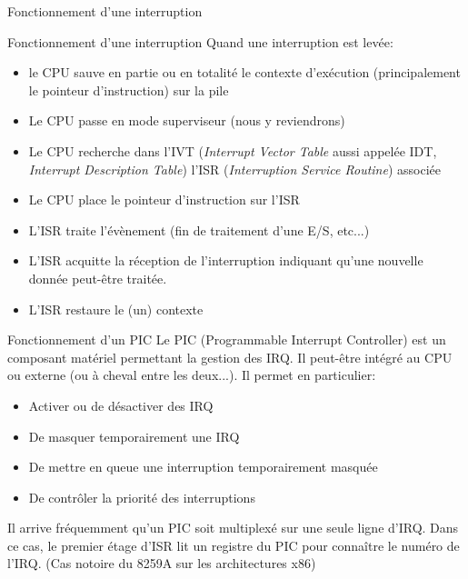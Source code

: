\begin{frame}{Fonctionnement d'une interruption}
  \begin{center}
  \end{center}
\end{frame}

\begin{frame}{Fonctionnement d'une interruption}
  Quand une  interruption est levée:
  \begin{itemize}
  \item le CPU sauve en  partie ou en totalité le contexte d'exécution
    (principalement le pointeur d'instruction) sur la pile
  \item Le CPU passe en mode superviseur (nous y reviendrons)
  \item  Le CPU  recherche dans  l'IVT (\emph{Interrupt  Vector Table}
    aussi  appelée  IDT,  \emph{Interrupt  Description  Table})  l'ISR
    (\emph{Interruption Service Routine}) associée
  \item Le CPU place le pointeur d'instruction sur l'ISR
  \item  L'ISR traite  l'évènement (fin  de traitement  d'une E/S,
    etc...)
  \item L'ISR acquitte la  réception de l'interruption indiquant qu'une
    nouvelle  donnée peut-être  traitée.
  \item L'ISR restaure le (un) contexte
  \end{itemize}
\end{frame}

\begin{frame}{Fonctionnement d'un PIC}
  Le PIC (Programmable Interrupt Controller) est un composant matériel
  permettant  la gestion  des  IRQ.  Il peut-être  intégré  au CPU  ou
  externe (ou à cheval entre les deux...). Il permet en particulier:
  \begin{itemize}
  \item Activer ou de désactiver des IRQ
  \item De masquer temporairement une IRQ
  \item De mettre en queue une interruption temporairement masquée
  \item De contrôler la priorité des interruptions
  \end{itemize}
  Il arrive fréquemment  qu'un PIC soit multiplexé sur  une seule ligne
  d'IRQ. Dans  ce cas, le premier  étage d'ISR lit un  registre du PIC
  pour connaître  le numéro de l'IRQ.   (Cas notoire du  8259A sur les
  architectures x86)

\end{frame}

